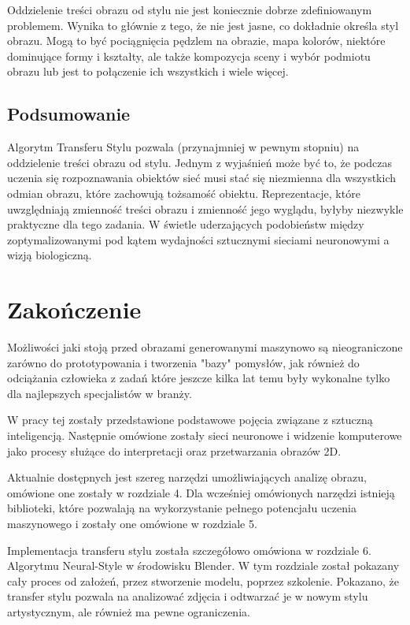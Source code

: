 \documentclass[brudnopis]{xmgr}
\begin{document}
Oddzielenie treści obrazu od stylu nie jest koniecznie dobrze zdefiniowanym problemem. Wynika to głównie z tego, że nie jest jasne, co dokładnie określa styl obrazu. Mogą to być pociągnięcia pędzlem na obrazie, mapa kolorów, niektóre dominujące formy i kształty, ale także kompozycja sceny i wybór podmiotu obrazu lub jest to połączenie ich wszystkich i wiele więcej. 

\section{Podsumowanie\label{s:dsssl}}

Algorytm Transferu Stylu pozwala (przynajmniej w pewnym stopniu) na oddzielenie treści obrazu od stylu. Jednym z wyjaśnień może być to, że podczas uczenia się rozpoznawania obiektów sieć musi stać się niezmienna dla wszystkich odmian obrazu, które zachowują tożsamość obiektu. Reprezentacje, które uwzględniają zmienność treści obrazu i zmienność jego wyglądu, byłyby niezwykle praktyczne dla tego zadania. W świetle uderzających podobieństw między zoptymalizowanymi pod kątem wydajności sztucznymi sieciami neuronowymi a wizją biologiczną.

\chapter{Zakończenie}
Możliwości jaki stoją przed obrazami generowanymi maszynowo są nieograniczone zarówno do prototypowania i tworzenia "bazy" pomysłów, jak również do odciążania człowieka z zadań które jeszcze kilka lat temu były wykonalne tylko dla najlepszych specjalistów w branży.

W pracy tej zostały przedstawione podstawowe pojęcia związane z sztuczną inteligencją. Następnie omówione zostały sieci neuronowe i widzenie komputerowe jako procesy służące do interpretacji oraz przetwarzania obrazów 2D. 

Aktualnie dostępnych jest szereg narzędzi umożliwiających analizę obrazu, omówione one zostały w rozdziale 4. Dla wcześniej omówionych narzędzi istnieją biblioteki, które pozwalają na wykorzystanie pełnego potencjału uczenia maszynowego i zostały one omówione w rozdziale 5.

Implementacja transferu stylu została szczegółowo omówiona w rozdziale 6. Algorytmu Neural-Style  w środowisku Blender. W tym rozdziale został pokazany cały proces od założeń, przez stworzenie modelu, poprzez szkolenie. Pokazano, że transfer stylu pozwala na analizować zdjęcia i odtwarzać je w nowym stylu artystycznym, ale również ma pewne ograniczenia. 
\end{document}
